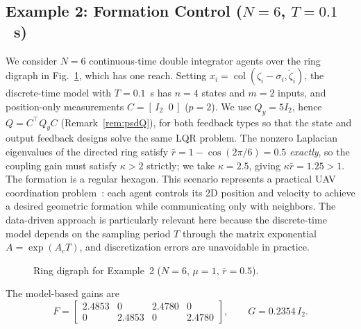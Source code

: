 \documentclass[12pt]{elsarticle}
\theoremstyle{remark}
\DeclareMathOperator{\col}{col}
\begin{document}
\subsection{Example 2: Formation Control ($N = 6$, $T = 0.1$~s)}
\label{subsec:sim2}
We consider $N = 6$ continuous-time double integrator agents over the ring digraph in Fig.~\ref{fig:graph6}, which has one reach. Setting $x_i = \col(\zeta_i - \sigma_i, \dot{\zeta}_i)$, the discrete-time model with $T = 0.1$~s has $n = 4$ states and $m = 2$ inputs, and position-only measurements $C = [\,I_2 \;\; 0\,]$ ($p = 2$). We use $Q_y = 5I_2$, hence $Q = C^\top Q_y C$ (Remark~\ref{rem:psdQ}), for both feedback types so that the state and output feedback designs solve the same LQR problem. The nonzero Laplacian eigenvalues of the directed ring satisfy $\bar{r} = 1 - \cos(2\pi/6) = 0.5$ \emph{exactly}, so the coupling gain must satisfy $\kappa > 2$ strictly; we take $\kappa = 2.5$, giving $\kappa\bar{r} = 1.25 > 1$. The formation is a regular hexagon. This scenario represents a practical UAV coordination problem~\cite{dony2021distributed,dony2021robust}: each agent controls its 2D position and velocity to achieve a desired geometric formation while communicating only with neighbors. The data-driven approach is particularly relevant here because the discrete-time model depends on the sampling period $T$ through the matrix exponential $A = \exp(A_c T)$, and discretization errors are unavoidable in practice.
\begin{figure}[!htbp]
\centering
{}
\caption{Ring digraph for Example~2 ($N=6$, $\mu=1$, $\bar{r}=0.5$).}
\label{fig:graph6}
\end{figure}
The model-based gains are
\begin{equation*}
F = \begin{bmatrix} 2.4853 & 0 & 2.4780 & 0 \\ 0 & 2.4853 & 0 & 2.4780 \end{bmatrix}, \qquad
G = 0.2354\, I_2 .
\end{equation*}
\end{document}
